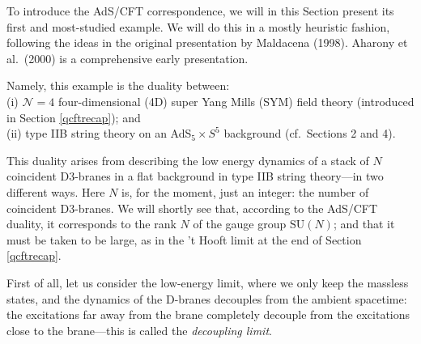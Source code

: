 \documentclass[12pt]{article}
\def\L{\Lambda}
\renewcommand{\^}[1]{\hat{#1}}
\newcommand{\tn}[1]{\mbox{\tiny #1}}
\newcommand{\eq}[1]{(\ref{#1})}
\begin{document}

To introduce the AdS/CFT correspondence, we will in this Section present its first and most-studied example. We will do this in a mostly heuristic fashion, following the ideas in the original presentation by Maldacena (1998). Aharony et al.~(2000) is a comprehensive early presentation.

 Namely, this example is the duality between:\\
 \indent  \indent (i) $\mathcal{N}=4$ four-dimensional (4D) super Yang Mills (SYM) field theory (introduced in Section \ref{qcftrecap}); 
 and \\
 \indent \indent (ii) type IIB string theory on an AdS$_5\times S^5$ background (cf.~Sections 2 and 4).

This duality arises from describing the 
low energy dynamics of a stack of $N$ coincident D3-branes in a flat background in type IIB string theory---in two different ways. Here $N$ is, for the moment, just an integer: the number of coincident D3-branes. We will shortly see that, according to the AdS/CFT duality, it corresponds to the rank $N$ of the gauge group $\mbox{SU}(N)$; and that it must be taken to be large, as in the 't Hooft limit at the end of Section \ref{qcftrecap}. 

First of all, let us consider the low-energy limit, where we only keep the massless states, and the dynamics of the D-branes decouples from the ambient spacetime: the excitations far away from the brane completely decouple from the excitations close to the brane---this is called the \emph{decoupling limit}.
\end{document}
